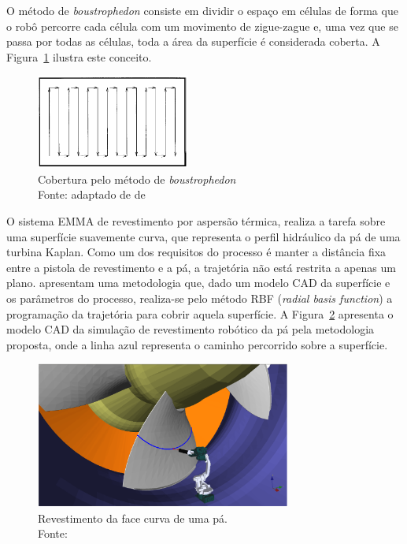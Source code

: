 O método de \textit{boustrophedon} consiste em dividir o espaço em células de
forma que o robô percorre cada célula com um movimento de zigue-zague e, uma vez
que se passa por todas as células, toda a área da superfície é considerada
coberta. A Figura~\ref{fig::boustrophedon} ilustra este conceito.

\begin{figure}[h]
	\centering 
 	\includegraphics[width=0.45\textwidth]{figs/boustrophedon}
 	\caption[Cobertura pelo método de \textit{boustrophedon}]{Cobertura pelo
 	método de \textit{boustrophedon} \\ Fonte: adaptado de
 	de~\cite{choset2000coverage}}
 	\label{fig::boustrophedon}
\end{figure}


O sistema EMMA de revestimento por aspersão térmica, realiza a tarefa sobre uma
superfície suavemente curva, que representa o perfil hidráulico da pá de uma
turbina Kaplan. Como um dos requisitos do processo é manter a distância fixa
entre a pistola de revestimento e a pá, a trajetória não está restrita a apenas
um plano. \citet{8206216} apresentam uma metodologia que, dado um modelo CAD da
superfície e os parâmetros do processo, realiza-se pelo método RBF
(\textit{radial basis function}) a programação da trajetória para cobrir aquela
superfície. A Figura~\ref{fig::coat_blade} apresenta o modelo CAD da simulação
de revestimento robótico da pá pela metodologia proposta, onde a linha azul
representa o caminho percorrido sobre a superfície.

\begin{figure}[h]
	\centering 
 	\includegraphics[width=0.75\textwidth]{figs/coat_blade}
 	\caption[Revestimento da face curva de uma pá]{Revestimento da face curva de
 	uma pá. \\Fonte: \citet{8206216}}
 	\label{fig::coat_blade}
\end{figure}

